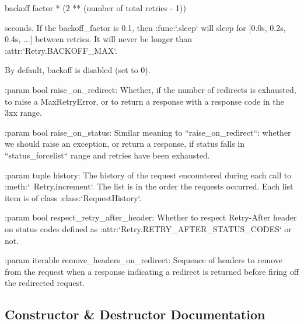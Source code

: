 \begin{DoxyVerb}
        {backoff factor} * (2 ** ({number of total retries} - 1))

    seconds. If the backoff_factor is 0.1, then :func:`.sleep` will sleep
    for [0.0s, 0.2s, 0.4s, ...] between retries. It will never be longer
    than :attr:`Retry.BACKOFF_MAX`.

    By default, backoff is disabled (set to 0).

:param bool raise_on_redirect: Whether, if the number of redirects is
    exhausted, to raise a MaxRetryError, or to return a response with a
    response code in the 3xx range.

:param bool raise_on_status: Similar meaning to ``raise_on_redirect``:
    whether we should raise an exception, or return a response,
    if status falls in ``status_forcelist`` range and retries have
    been exhausted.

:param tuple history: The history of the request encountered during
    each call to :meth:`~Retry.increment`. The list is in the order
    the requests occurred. Each list item is of class :class:`RequestHistory`.

:param bool respect_retry_after_header:
    Whether to respect Retry-After header on status codes defined as
    :attr:`Retry.RETRY_AFTER_STATUS_CODES` or not.

:param iterable remove_headers_on_redirect:
    Sequence of headers to remove from the request when a response
    indicating a redirect is returned before firing off the redirected
    request.
\end{DoxyVerb}
 

\subsection{Constructor \& Destructor Documentation}
\mbox{\label{classpip_1_1__vendor_1_1urllib3_1_1util_1_1retry_1_1Retry_abd41bf0f157235ecf088969dcdbf7e4d}} 
